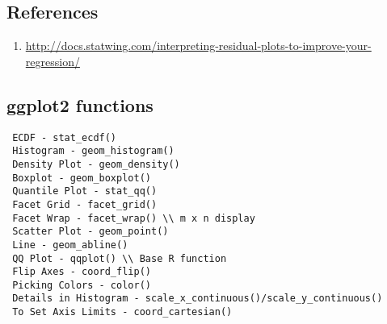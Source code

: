 \documentclass[11pt]{article}
\begin{document}
\subsection*{References}
\begin{enumerate}
	\item \url{http://docs.statwing.com/interpreting-residual-plots-to-improve-your-regression/}
\end{enumerate}
\subsection*{ggplot2 functions}
\begin{verbatim}
 ECDF - stat_ecdf()
 Histogram - geom_histogram()
 Density Plot - geom_density()
 Boxplot - geom_boxplot()
 Quantile Plot - stat_qq()
 Facet Grid - facet_grid()
 Facet Wrap - facet_wrap() \\ m x n display
 Scatter Plot - geom_point()
 Line - geom_abline()
 QQ Plot - qqplot() \\ Base R function
 Flip Axes - coord_flip()
 Picking Colors - color()
 Details in Histogram - scale_x_continuous()/scale_y_continuous()
 To Set Axis Limits - coord_cartesian()
\end{verbatim}
\end{document}

